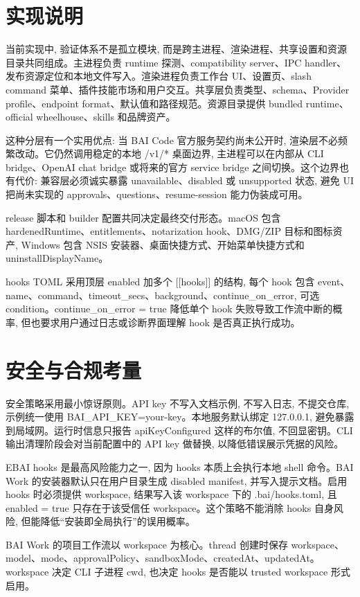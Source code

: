 \section{实现说明}
当前实现中, 验证体系不是孤立模块, 而是跨主进程、渲染进程、共享设置和资源目录共同组成。主进程负责 runtime 探测、compatibility server、IPC handler、发布资源定位和本地文件写入。渲染进程负责工作台 UI、设置页、slash command 菜单、插件技能市场和用户交互。共享层负责类型、schema、Provider profile、endpoint format、默认值和路径规范。资源目录提供 bundled runtime、official wheelhouse、skills 和品牌资产。

这种分层有一个实用优点: 当 BAI Code 官方服务契约尚未公开时, 渲染层不必频繁改动。它仍然调用稳定的本地 /v1/* 桌面边界, 主进程可以在内部从 CLI bridge、OpenAI chat bridge 或将来的官方 service bridge 之间切换。这个边界也有代价: 兼容层必须诚实暴露 unavailable、disabled 或 unsupported 状态, 避免 UI 把尚未实现的 approvals、questions、resume-session 能力伪装成可用。

release 脚本和 builder 配置共同决定最终交付形态。macOS 包含 hardenedRuntime、entitlements、notarization hook、DMG/ZIP 目标和图标资产, Windows 包含 NSIS 安装器、桌面快捷方式、开始菜单快捷方式和 uninstallDisplayName。

hooks TOML 采用顶层 enabled 加多个 [[hooks]] 的结构, 每个 hook 包含 event、name、command、timeout\_secs、background、continue\_on\_error, 可选 condition。continue\_on\_error = true 降低单个 hook 失败导致工作流中断的概率, 但也要求用户通过日志或诊断界面理解 hook 是否真正执行成功。

\section{安全与合规考量}
安全策略采用最小惊讶原则。API key 不写入文档示例, 不写入日志, 不提交仓库, 示例统一使用 BAI\_API\_KEY=your-key。本地服务默认绑定 127.0.0.1, 避免暴露到局域网。运行时信息只报告 apiKeyConfigured 这样的布尔值, 不回显密钥。CLI 输出清理阶段会对当前配置中的 API key 做替换, 以降低错误展示凭据的风险。

EBAI hooks 是最高风险能力之一, 因为 hooks 本质上会执行本地 shell 命令。BAI Work 的安装器默认只在用户目录生成 disabled manifest, 并写入提示文档。启用 hooks 时必须提供 workspace, 结果写入该 workspace 下的 .bai/hooks.toml, 且 enabled = true 只存在于该受信任 workspace。这个策略不能消除 hooks 自身风险, 但能降低“安装即全局执行”的误用概率。

BAI Work 的项目工作流以 workspace 为核心。thread 创建时保存 workspace、model、mode、approvalPolicy、sandboxMode、createdAt、updatedAt。workspace 决定 CLI 子进程 cwd, 也决定 hooks 是否能以 trusted workspace 形式启用。


